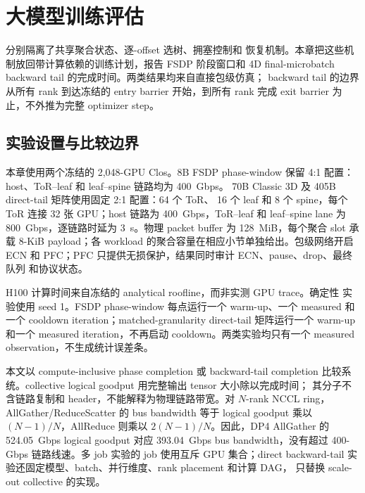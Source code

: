 \chapter{大模型训练评估}
\label{chap:llm-evaluation}

 分别隔离了共享聚合状态、逐-offset 选树、拥塞控制和
恢复机制。本章把这些机制放回带计算依赖的训练计划，报告 FSDP 阶段窗口和
4D final-microbatch backward tail 的完成时间。两类结果均来自直接包级仿真；
backward tail 的边界从所有 rank 到达冻结的 entry barrier 开始，到所有 rank
完成 exit barrier 为止，不外推为完整 optimizer step。


\section{实验设置与比较边界}
\label{ssec:llm-setup}

本章使用两个冻结的 2,048-GPU Clos。8B FSDP phase-window 保留
4:1 配置：host、ToR--leaf 和 leaf--spine 链路均为 400~Gbps。
70B Classic 3D 及 405B direct-tail 矩阵使用固定 2:1 配置：64 个 ToR、
16 个 leaf 和 8 个 spine，每个 ToR 连接 32 张 GPU；host 链路为
400~Gbps，ToR--leaf 和 leaf--spine lane 为 800~Gbps，逐链路时延为
3~\textmu s。物理 packet buffer 为 128~MiB，每个聚合 slot 承载
8-KiB payload；各 workload 的聚合容量在相应小节单独给出。包级网络开启
ECN 和 PFC；PFC 只提供无损保护，结果同时审计 ECN、pause、drop、最终队列
和协议状态。

H100 计算时间来自冻结的 analytical roofline，而非实测 GPU trace。确定性
实验使用 seed 1。FSDP phase-window 每点运行一个 warm-up、一个 measured
和一个 cooldown iteration；matched-granularity direct-tail 矩阵运行一个
warm-up 和一个 measured iteration，不再启动 cooldown。两类实验均只有一个
measured observation，不生成统计误差条。

本文以 compute-inclusive phase completion 或 backward-tail completion
比较系统。collective logical goodput 用完整输出 tensor 大小除以完成时间；
其分子不含链路复制和 header，不能解释为物理链路带宽。对 $N$-rank NCCL
ring，AllGather/ReduceScatter 的 bus bandwidth 等于 logical goodput 乘以
$(N-1)/N$，AllReduce 则乘以 $2(N-1)/N$。因此，DP4 AllGather 的
524.05~Gbps logical goodput 对应 393.04~Gbps bus bandwidth，没有超过
400-Gbps 链路线速。多 job 实验的 job 使用互斥 GPU 集合；direct
backward-tail 实验还固定模型、batch、并行维度、rank placement 和计算 DAG，
只替换 scale-out collective 的实现。

